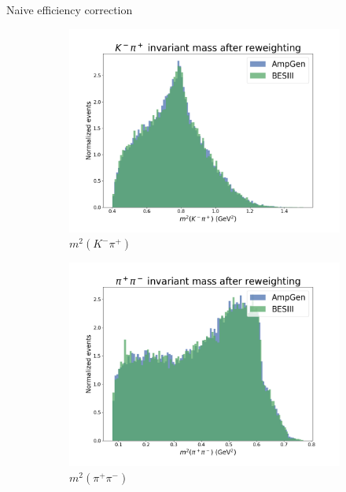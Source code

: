 \documentclass{beamer}
\begin{document}
\begin{frame}{Naive efficiency correction}
\begin{figure}
\begin{subfigure}{0.33\textwidth}
      \includegraphics[width = 1.0\textwidth]{Plots/s12_AfterReweighting.png}
      \caption{$m^2(K^-\pi^+)$}
    \end{subfigure}
    \begin{subfigure}{0.33\textwidth}
      \includegraphics[width = 1.0\textwidth]{Plots/s23_AfterReweighting.png}
      \caption{$m^2(\pi^+\pi^-)$}
    \end{subfigure}%
    \begin{subfigure}{0.33\textwidth}

\end{subfigure}
\end{figure}
\end{frame}
\end{document}
